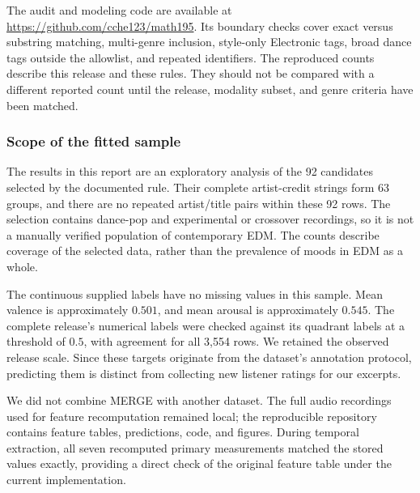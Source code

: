 The audit and modeling code are available at \url{https://github.com/cche123/math195}. Its boundary checks cover exact versus substring matching, multi-genre inclusion, style-only Electronic tags, broad dance tags outside the allowlist, and repeated identifiers. The reproduced counts describe this release and these rules. They should not be compared with a different reported count until the release, modality subset, and genre criteria have been matched.

\subsubsection{Scope of the fitted sample}

The results in this report are an exploratory analysis of the 92 candidates selected by the documented rule. Their complete artist-credit strings form 63 groups, and there are no repeated artist/title pairs within these 92 rows. The selection contains dance-pop and experimental or crossover recordings, so it is not a manually verified population of contemporary EDM. The counts describe coverage of the selected data, rather than the prevalence of moods in EDM as a whole.

The continuous supplied labels have no missing values in this sample. Mean valence is approximately $0.501$, and mean arousal is approximately $0.545$. The complete release's numerical labels were checked against its quadrant labels at a threshold of $0.5$, with agreement for all 3,554 rows. We retained the observed release scale. Since these targets originate from the dataset's annotation protocol, predicting them is distinct from collecting new listener ratings for our excerpts.

We did not combine MERGE with another dataset. The full audio recordings used for feature recomputation remained local; the reproducible repository contains feature tables, predictions, code, and figures. During temporal extraction, all seven recomputed primary measurements matched the stored values exactly, providing a direct check of the original feature table under the current implementation.
